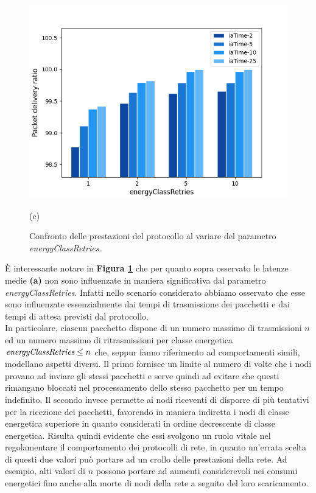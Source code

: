 \documentclass[binding=0.6cm,TFA]{sapthesis}
\begin{document}
\begin{figure}[h]
\begin{minipage}{.5\textwidth}
        \includegraphics[width=1\linewidth]{pdr_retries__comparison_plot.png}
        \caption*{(c)}
    \end{minipage}
    \caption{Confronto delle prestazioni del protocollo al variare del parametro \emph{energyClassRetries}.}
    \label{comparison-retries}
\end{figure}

È interessante notare in \textbf{Figura \ref{comparison-retries}} che per quanto sopra osservato le latenze medie \textbf{(a)} non sono influenzate in
maniera significativa dal parametro \emph{energyClassRetries}. Infatti nello scenario considerato abbiamo osservato che esse sono influenzate essenzialmente dai
tempi di trasmissione dei pacchetti e dai tempi di attesa previsti dal protocollo.\\

In particolare, ciascun pacchetto dispone di un numero massimo di trasmissioni $n$ ed un numero massimo di ritrasmissioni per classe energetica
$\emph{energyClassRetries} \leq n$ che, seppur fanno riferimento ad comportamenti simili, modellano aspetti diversi. Il primo fornisce un limite al
numero di volte che i nodi provano ad inviare gli stessi pacchetti e serve quindi ad evitare che questi rimangano bloccati nel processamento dello stesso pacchetto
per un tempo indefinito. Il secondo invece permette ai nodi riceventi di disporre di più tentativi per la ricezione dei pacchetti, favorendo in maniera indiretta
i nodi di classe energetica superiore in quanto considerati in ordine decrescente di classe energetica. Risulta quindi evidente che essi svolgono
un ruolo vitale nel regolamentare il comportamento dei protocolli di rete, in quanto un'errata scelta di questi due valori può portare ad un crollo
delle prestazioni della rete. Ad esempio, alti valori di $n$ possono portare ad aumenti considerevoli nei consumi energetici fino anche alla morte di
nodi della rete a seguito del loro scaricamento.\\
\end{document}
